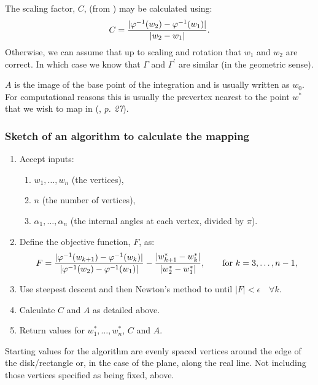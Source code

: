 The scaling factor, $C$, (from ) may be calculated using:
\begin{equation}
C=\frac{\vert \varphi^{-1}(w_2)-\varphi^{-1}(w_1)\vert}{\vert w_2 - w_1\vert}.
\end{equation}
Otherwise, we can assume that up to scaling and rotation that $w_1$ and $w_2$ are correct. In which case we know that $\Gamma$ and $\Gamma^\prime$ are similar (in the geometric sense). 

$A$ is the image of the base point of the integration and is usually written as $w_0$. For computational reasons this is usually the prevertex nearest to the point $w^*$ that we wish to map in   (\cite{driscoll}, \emph{p. 27}).


\subsubsection{Sketch of an algorithm to calculate the \sch mapping}
\label{algorithmsketch}
\begin{enumerate}
\item Accept inputs:
   \begin{enumerate} 
      \item $w_1,\dots,w_n$ (the vertices),
      \item $n$ (the number of vertices),
      \item $\alpha_1,\dots,\alpha_n$ (the internal angles at each vertex, divided by $\pi$).
   \end{enumerate}
\item Define the objective function, $F$, as:
 \begin{equation*}
F=\frac{\vert \varphi^{-1}(w_{k+1}) -  \varphi^{-1}(w_k) \vert}{\vert \varphi^{-1}(w_2)-\varphi^{-1}(w_1)\vert} - \frac{\vert w^*_{k+1} - w^*_k\vert}{\vert w^*_2 - w^*_1\vert}, \qquad \text{for } k=3,\dots,n-1,
 \end{equation*}
\item Use steepest descent and then Newton's method to until $\vert F\vert < \epsilon \quad \forall k$. \item Calculate $C$ and $A$ as detailed above.
\item Return values for $w^*_1,\dots,w^*_n$, $C$ and $A$.
\end{enumerate}

Starting values for the algorithm are evenly spaced vertices around the edge of the disk/rectangle or, in the case of the plane, along the real line. Not including those vertices specified as being fixed, above.

